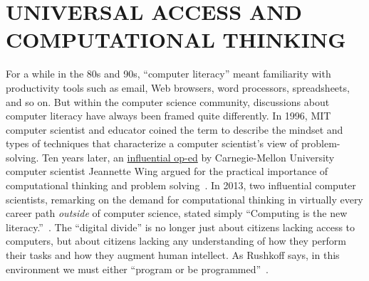 
\section{UNIVERSAL ACCESS AND COMPUTATIONAL THINKING}




For a while in the 80s and 90s, ``computer literacy'' meant familiarity
with productivity tools such as email, Web browsers, word processors,
spreadsheets, and so on.
But within the computer science community, discussions about computer
literacy have always been framed quite differently.
In 1996, MIT computer scientist and educator  coined
the term  to describe the mindset and types of
techniques that characterize a computer scientist's view of
problem-solving.
Ten years later, an
\href{http://www.cs.cmu.edu/afs/cs/usr/wing/www/publications/Wing06.pdf}{influential
op-ed} by Carnegie-Mellon University computer scientist Jeannette Wing
argued for the practical importance of computational thinking and
problem solving~\cite{wing_computational_thinking}.
In 2013, two influential computer scientists, remarking on the demand
for computational thinking in virtually every career path \emph{outside}
of computer science,
stated simply
``Computing is the new
literacy.''~\cite{ieee_computer_special_issue_computing_education}.
The ``digital divide'' is no longer just about citizens lacking 
access to computers, but about citizens lacking any understanding of how
they perform 
their tasks and how they augment human intellect.  As Rushkoff says, in
this environment we must either ``program or be
programmed''~\cite{rushkoff}.

